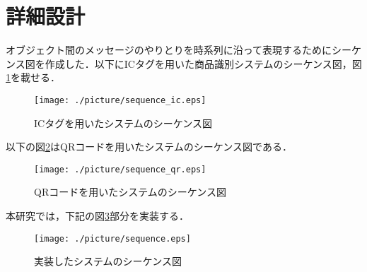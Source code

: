 

\section{詳細設計}

オブジェクト間のメッセージのやりとりを時系列に沿って表現するためにシーケンス図を作成した．以下にICタグを用いた商品識別システムのシーケンス図，図\ref{sequence_ic}を載せる．

\begin{figure}[htbp]
\centering
\texttt{[image: ./picture/sequence\_ic.eps]}
\caption{ICタグを用いたシステムのシーケンス図}
\label{sequence_ic}
\end{figure}


以下の図\ref{sequence_qr}はQRコードを用いたシステムのシーケンス図である．


\begin{figure}[htbp]
\centering
\texttt{[image: ./picture/sequence\_qr.eps]}
\caption{QRコードを用いたシステムのシーケンス図}
\label{sequence_qr}
\end{figure}


本研究では，下記の図\ref{sequence}部分を実装する．


\begin{figure}[htbp]
\centering
\texttt{[image: ./picture/sequence.eps]}
\caption{実装したシステムのシーケンス図}
\label{sequence}
\end{figure}